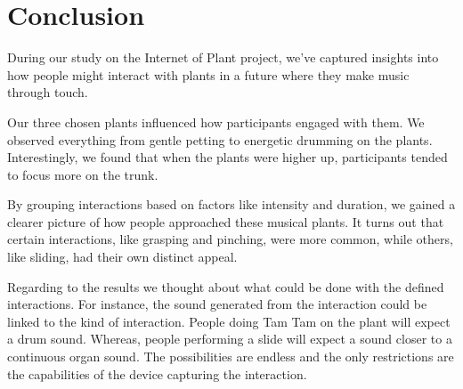 \section{Conclusion}

During our study on the Internet of Plant project, we've captured insights into how people might interact with plants in a future where they make music through touch.

Our three chosen plants influenced how participants engaged with them. We observed everything from gentle petting to energetic drumming on the plants.
Interestingly, we found that when the plants were higher up, participants tended to focus more on the trunk.

By grouping interactions based on factors like intensity and duration, we gained a clearer picture of how people approached these musical plants.
It turns out that certain interactions, like grasping and pinching, were more common, while others, like sliding, had their own distinct appeal.

Regarding to the results we thought about what could be done with the defined interactions.
For instance, the sound generated from the interaction could be linked to the kind of interaction.
People doing Tam Tam on the plant will expect a drum sound. Whereas, people performing a slide will expect a sound closer to a continuous organ sound.
The possibilities are endless and the only restrictions are the capabilities of the device capturing the interaction. 